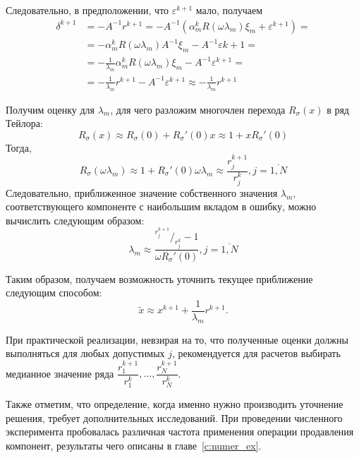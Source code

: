 \documentclass[a4paper,14pt]{extreport}
\begin{document}
Следовательно, в предположении, что $\varepsilon^{k+1}$ мало, получаем
	\begin{equation}
	\label{komp:many_eq2}	
		\begin{aligned}
		\delta^{k+1} &= -A^{-1}r^{k+1} = -A^{-1}(\alpha_m^kR(\omega\lambda_m)\xi_m + \varepsilon^{k+1}) = \\ &= -\alpha_m^k R(\omega \lambda_m)A^{-1}\xi_m -A^{-1}\varepsilon{k+1} = \\ &= -\frac{1}{\lambda_m} \alpha_m^kR(\omega \lambda_m)\xi_m - A^{-1}\varepsilon^{k+1} = \\ &= -\frac{1}{\lambda_m} r^{k+1} - A^{-1}\varepsilon^{k+1} \approx -\frac{1}{\lambda_m}r^{k+1}
		\end{aligned}
	\end{equation}

Получим оценку для $\lambda_m$, для чего разложим многочлен перехода $R_\sigma(x)$ в ряд Тейлора:
	\begin{equation}
	\label{komp:taylor1}	
	R_\sigma(x) \approx R_\sigma(0) + R_\sigma'(0)x \approx 1 + xR_\sigma'(0)
	\end{equation}
Тогда,
	\begin{equation}
	\label{komp:taylor2}	
	R_\sigma(\omega\lambda_m) \approx 1 + R_\sigma'(0)\omega\lambda_m \approx \frac{r_j^{k+1}}{r_j^k}, j=\overbar{1, N}
	\end{equation}
Следовательно, приближенное значение собственного значения $\lambda_m$, соответствующего компоненте с наибольшим вкладом в ошибку, можно вычислить следующим образом:
\begin{equation}
	\label{komp:lambda}	
	\lambda_m \approx \frac{ {}^{r_j^{k+1}}/_{r_j^k} - 1}{\omega R_\sigma'(0)}, j=\overbar{1, N}
	\end{equation}
	
Таким образом, получаем возможность уточнить текущее приближение следующим способом:
	\begin{equation}	
	\label{komp:opressioneq}	
	\widetilde{x} \approx x^{k+1} + \dfrac{1}{\lambda_m}r^{k+1}.
	\end{equation}

При практической реализации, невзирая на то, что полученные оценки должны выполняться для любых допустимых $j$, рекомендуется для расчетов выбирать медианное значение ряда $\dfrac{r_1^{k+1}}{r_1^k}, \ldots, \dfrac{r_N^{k+1}}{r_N^k}$.

Также отметим, что определение, когда именно нужно производить уточнение решения, требует дополнительных исследований. При проведении численного эксперимента пробовалась различная частота применения операции продавления компонент, результаты чего описаны в главе~\ref{c:numer_ex}.
  
\end{document}
